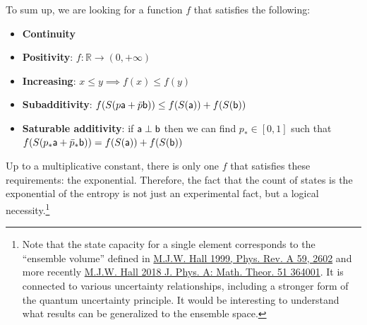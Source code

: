 To sum up, we are looking for a function $f$ that satisfies the following:
\begin{itemize}
	\item \textbf{Continuity}
	\item \textbf{Positivity}: $f : \mathbb{R} \to (0,+\infty)$
	\item \textbf{Increasing}: $x \leq y \implies f(x) \leq f(y)$
	\item \textbf{Subadditivity}: $f(S(p\ens[a]+\bar{p}\ens[b])) \leq f(S(\ens[a])) + f(S(\ens[b]))$
	\item \textbf{Saturable additivity}: if $\ens[a] \ortho \ens[b]$ then we can find $p_* \in [0,1]$ such that $f(S(p_*\ens[a]+\bar{p}_*\ens[b])) = f(S(\ens[a])) + f(S(\ens[b]))$
\end{itemize} 
Up to a multiplicative constant, there is only one $f$ that satisfies these requirements: the exponential. Therefore, the fact that the count of states is the exponential of the entropy is not just an experimental fact, but a logical necessity.\footnote{Note that the state capacity for a single element corresponds to the ``ensemble volume'' defined in \href{https://journals.aps.org/pra/abstract/10.1103/PhysRevA.59.2602}{M.J.W. Hall 1999, Phys. Rev. A 59, 2602} and more recently \href{https://iopscience.iop.org/article/10.1088/1751-8121/aad50f}{M.J.W. Hall 2018 J. Phys. A: Math. Theor. 51 364001}. It is connected to various uncertainty relationships, including a stronger form of the quantum uncertainty principle. It would be interesting to understand what results can be generalized to the ensemble space.}

